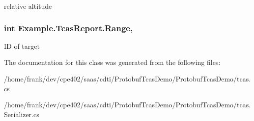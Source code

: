 relative altitude

\hypertarget{class_example_1_1_tcas_report_a32691ce0bb3b627f44655cf3013f5f20}{}
\subsubsection[{Range}]{\setlength{\rightskip}{0pt plus 5cm}int Example.\+Tcas\+Report.\+Range\hspace{0.3cm}{\ttfamily [get]}, {\ttfamily [set]}}\label{class_example_1_1_tcas_report_a32691ce0bb3b627f44655cf3013f5f20}


I\+D of target



The documentation for this class was generated from the following files\+:\begin{DoxyCompactItemize}
\item 
/home/frank/dev/cpe402/saas/cdti/\+Protobuf\+Tcas\+Demo/\+Protobuf\+Tcas\+Demo/tcas.\+cs\item 
/home/frank/dev/cpe402/saas/cdti/\+Protobuf\+Tcas\+Demo/\+Protobuf\+Tcas\+Demo/tcas.\+Serializer.\+cs\end{DoxyCompactItemize}
